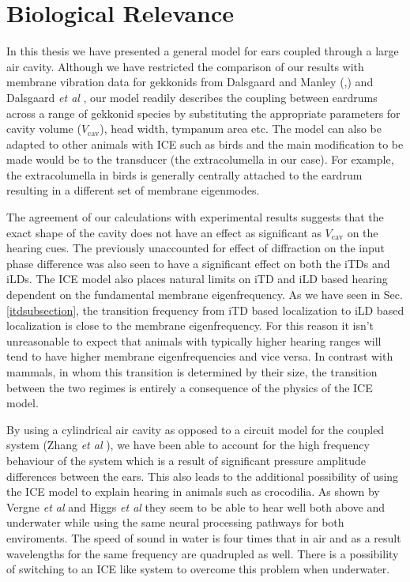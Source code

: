 \section{Biological Relevance}
In this thesis we have presented a general model for ears coupled through a large air cavity. Although we
have restricted the comparison of our results with membrane vibration data for gekkonids from Dalsgaard and Manley (\cite{dalsgaardmanley1},\cite{dalsgaardmanley2})
and Dalsgaard \emph{et al} \cite{dalsgaardtangcarr}, our model readily describes the coupling between eardrums across a range of gekkonid species by substituting
the appropriate parameters for cavity volume ($V_{\mathrm{cav}}$), head width, tympanum area etc. The model can also be adapted to other animals with ICE such as
birds and the main modification to be made would be to the transducer (the extracolumella in our case). For example, the extracolumella in birds is generally
centrally attached to the eardrum \cite{millsavianmiddleear} resulting in a different set of membrane eigenmodes. 

The agreement of our calculations with
experimental results suggests that the exact shape of the cavity does not have an effect as significant as $V_{\mathrm{cav}}$ on the hearing cues.  The previously
unaccounted for effect of diffraction on the input phase difference was also seen to have a significant effect on both the iTDs and iLDs.
The ICE model also places natural limits on iTD and iLD based hearing dependent on the fundamental membrane eigenfrequency. As we have seen in Sec. \ref{itdsubsection},
the transition frequency from iTD based localization to iLD based localization is close to the membrane eigenfrequency. For this reason it isn't unreasonable to expect that animals with typically
higher hearing ranges will tend to have higher membrane eigenfrequencies and vice versa. In contrast with mammals, in whom this transition is determined by their size, the transition
between the two regimes is entirely a consequence of the physics of the ICE model.

By using a cylindrical air cavity as opposed to a circuit model for the coupled system (Zhang \emph{et al} \cite{zhanghallam}), we have been able to account for the
high frequency behaviour of the system which is a result of significant pressure amplitude differences between the ears. This also leads to the additional possibility of using the ICE model to explain hearing in
animals such as crocodilia. As shown by Vergne \emph{et al} \cite{vergnecrocodilia} and Higgs \emph{et al} \cite{higgscrocodilia} they seem to be able to hear well both above and underwater while
using the same neural processing pathways for both enviroments.
The speed of sound in water is four times that in air and as a result wavelengths for the same frequency are quadrupled as well. There is a possibility of switching to an ICE
like system to overcome this problem when underwater.

